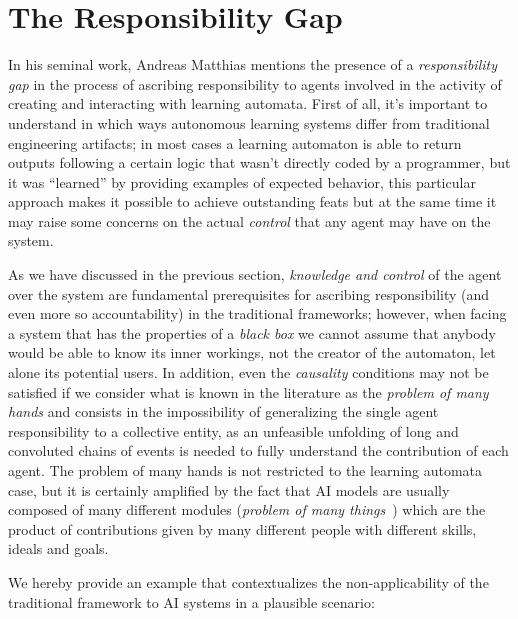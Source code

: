 \section{The Responsibility Gap}\label{sec:responsibilitygap}

In his seminal work, Andreas Matthias mentions the presence of a \textit{responsibility gap} \parencite{MATTRG} in the process of ascribing responsibility to agents involved in the activity of creating and interacting with learning automata.
First of all, it's important to understand in which ways autonomous learning systems differ from traditional engineering artifacts; in most cases a learning automaton is able to return outputs following a certain logic that wasn't directly coded by a programmer, but it was ``learned'' by providing examples of expected behavior, this particular approach makes it possible to achieve outstanding feats but at the same time it may raise some concerns on the actual \textit{control} that any agent may have on the system. 

As we have discussed in the previous section, \textit{knowledge and control} of the agent over the system are fundamental prerequisites for ascribing responsibility (and even more so accountability) in the traditional frameworks; however, when facing a system that has the properties of a \textit{black box} we cannot assume that anybody would be able to know its inner workings, not the creator of the automaton, let alone its potential users.
In addition, even the \textit{causality} conditions may not be satisfied if we consider what is known in the literature as the \textit{problem of many hands} \parencite{POPOM, COEAIR, NISAIA} and consists in the impossibility of generalizing the single agent responsibility to a collective entity, as an unfeasible unfolding of long and convoluted chains of events is needed to fully understand the contribution of each agent.
The problem of many hands is not restricted to the learning automata case, but it is certainly amplified by the fact that AI models are usually composed of many different modules (\textit{problem of many things}~\cite{COEAIR}) which are the product of contributions given by many different people with different skills, ideals and goals.

We hereby provide an example that contextualizes the non-applicability of the traditional framework to AI systems in a plausible scenario: 